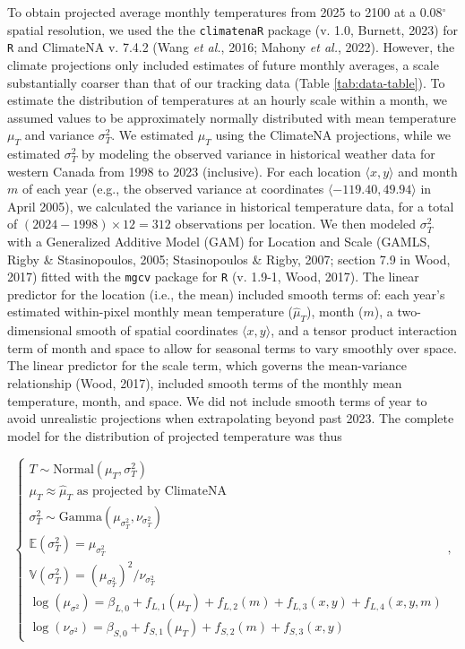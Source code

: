 \documentclass[
  12pt,
]{article}
\begin{document}
To obtain projected average monthly temperatures from 2025 to 2100 at a 0.08\(^\circ\) spatial resolution, we used the the \texttt{climatenaR} package (v. 1.0, Burnett, 2023) for \texttt{R} and ClimateNA v. 7.4.2 (Wang \emph{et al.}, 2016; Mahony \emph{et al.}, 2022). However, the climate projections only included estimates of future monthly averages, a scale substantially coarser than that of our tracking data (Table \ref{tab:data-table}). To estimate the distribution of temperatures at an hourly scale within a month, we assumed values to be approximately normally distributed with mean temperature \(\mu_T\) and variance \(\sigma^2_T\). We estimated \(\mu_T\) using the ClimateNA projections, while we estimated \(\sigma^2_T\) by modeling the observed variance in historical weather data for western Canada from 1998 to 2023 (inclusive). For each location \(\langle x, y \rangle\) and month \(m\) of each year (e.g., the observed variance at coordinates \(\langle -119.40, 49.94 \rangle\) in April 2005), we calculated the variance in historical temperature data, for a total of \((2024 - 1998) \times 12 = 312\) observations per location. We then modeled \(\sigma^2_T\) with a Generalized Additive Model (GAM) for Location and Scale (GAMLS, Rigby \& Stasinopoulos, 2005; Stasinopoulos \& Rigby, 2007; section 7.9 in Wood, 2017) fitted with the \texttt{mgcv} package for \texttt{R} (v. 1.9-1, Wood, 2017). The linear predictor for the location (i.e., the mean) included smooth terms of: each year's estimated within-pixel monthly mean temperature (\(\hat \mu_T\)), month (\(m\)), a two-dimensional smooth of spatial coordinates \(\langle x, y \rangle\), and a tensor product interaction term of month and space to allow for seasonal terms to vary smoothly over space. The linear predictor for the scale term, which governs the mean-variance relationship (Wood, 2017), included smooth terms of the monthly mean temperature, month, and space. We did not include smooth terms of year to avoid unrealistic projections when extrapolating beyond past 2023. The complete model for the distribution of projected temperature was thus

\begin{equation}\label{eq:temp-var-model}
\begin{cases}
T \sim \text{Normal}(\mu_T, \sigma^2_T) \\
\mu_T \approx \hat \mu_T \text{ as projected by ClimateNA} \\
\sigma^2_T \sim \text{Gamma}(\mu_{\sigma^2_T}, \nu_{\sigma^2_T}) \\
\mathbb E(\sigma^2_T) = \mu_{\sigma^2_T} \\
\mathbb V(\sigma^2_T) = (\mu_{\sigma^2_T})^2 / \nu_{\sigma^2_T} \\
\log(\mu_{\sigma^2}) = \beta_{L,0} + f_{L,1}(\mu_T) + f_{L,2}(m) + f_{L,3}(x, y) + f_{L,4}(x, y, m) \\
\log(\nu_{\sigma^2}) = \beta_{S,0} + f_{S,1}(\mu_T) + f_{S,2}(m) + f_{S,3}(x, y)
\end{cases},
\end{equation}
\end{document}
